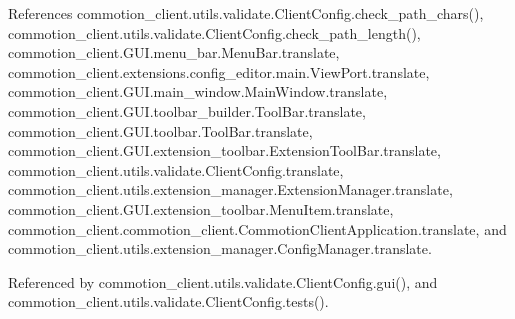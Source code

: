 References commotion\+\_\+client.\+utils.\+validate.\+Client\+Config.\+check\+\_\+path\+\_\+chars(), commotion\+\_\+client.\+utils.\+validate.\+Client\+Config.\+check\+\_\+path\+\_\+length(), commotion\+\_\+client.\+G\+U\+I.\+menu\+\_\+bar.\+Menu\+Bar.\+translate, commotion\+\_\+client.\+extensions.\+config\+\_\+editor.\+main.\+View\+Port.\+translate, commotion\+\_\+client.\+G\+U\+I.\+main\+\_\+window.\+Main\+Window.\+translate, commotion\+\_\+client.\+G\+U\+I.\+toolbar\+\_\+builder.\+Tool\+Bar.\+translate, commotion\+\_\+client.\+G\+U\+I.\+toolbar.\+Tool\+Bar.\+translate, commotion\+\_\+client.\+G\+U\+I.\+extension\+\_\+toolbar.\+Extension\+Tool\+Bar.\+translate, commotion\+\_\+client.\+utils.\+validate.\+Client\+Config.\+translate, commotion\+\_\+client.\+utils.\+extension\+\_\+manager.\+Extension\+Manager.\+translate, commotion\+\_\+client.\+G\+U\+I.\+extension\+\_\+toolbar.\+Menu\+Item.\+translate, commotion\+\_\+client.\+commotion\+\_\+client.\+Commotion\+Client\+Application.\+translate, and commotion\+\_\+client.\+utils.\+extension\+\_\+manager.\+Config\+Manager.\+translate.



Referenced by commotion\+\_\+client.\+utils.\+validate.\+Client\+Config.\+gui(), and commotion\+\_\+client.\+utils.\+validate.\+Client\+Config.\+tests().


